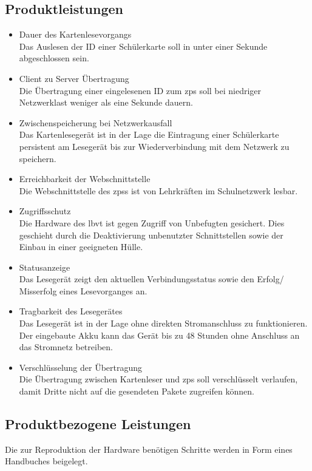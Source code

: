 \subsection{Produktleistungen}
\begin{itemize}[leftmargin=1.0in]
    \item [\ll] Dauer des Kartenlesevorgangs \\
        Das Auslesen der ID einer Schülerkarte soll in unter einer Sekunde abgeschlossen sein.
    \item [\ll] Client zu Server Übertragung \\
        Die Übertragung einer eingelesenen ID zum \gls{zps} soll bei niedriger Netzwerklast weniger als eine Sekunde dauern.
    \item [\ll] Zwischenspeicherung bei Netzwerkausfall \\
        Das Kartenlesegerät ist in der Lage die Eintragung einer Schülerkarte persistent am Lesegerät bis zur Wiederverbindung mit dem Netzwerk zu speichern.
    \item [\ll] Erreichbarkeit der Webschnittstelle \\
        Die Webschnittstelle des \gls{zps}s ist von Lehrkräften im Schulnetzwerk lesbar.
    \item [\ll] Zugriffsschutz \\
        Die Hardware des \gls{lbvt} ist gegen Zugriff von Unbefugten gesichert. Dies geschieht durch die Deaktivierung unbenutzter Schnittstellen sowie der Einbau in einer geeigneten Hülle.
    \item [\ll] Statusanzeige \\
        Das Lesegerät zeigt den aktuellen Verbindungsstatus sowie den Erfolg/ Misserfolg eines Lesevorganges an.
    \item [\ll] Tragbarkeit des Lesegerätes \\
        Das Lesegerät ist in der Lage ohne direkten Stromanschluss zu funktionieren. Der eingebaute Akku kann das Gerät bis zu 48 Stunden ohne Anschluss an das Stromnetz betreiben.
    \item [\ll] Verschlüsselung der Übertragung \\
        Die Übertragung zwischen Kartenleser und \gls{zps} soll verschlüsselt verlaufen, damit Dritte nicht auf die gesendeten Pakete zugreifen können.
\end{itemize}
\subsection{Produktbezogene Leistungen}
Die zur Reproduktion der Hardware benötigen Schritte werden in Form eines Handbuches beigelegt. 
